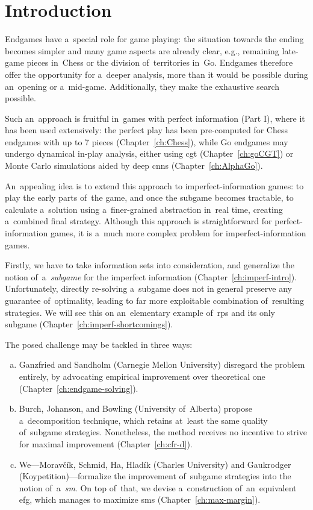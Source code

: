 \chapter*{Introduction}
Endgames have a~special role for game playing:
the situation towards the ending becomes simpler and many game aspects are already clear, e.g., remaining late-game pieces in~Chess or the division of~territories in~Go.
Endgames therefore offer the opportunity for a~deeper analysis, more than it would be possible during an~opening or a~mid-game.
Additionally, they make the exhaustive search possible.

Such an~approach is fruitful in~games with perfect information (Part I), where it has been used extensively:
the perfect play has been pre-computed for Chess endgames with up to 7 pieces (Chapter~\ref{ch:Chess}), while Go endgames may undergo dynamical in-play analysis, either using \acrlong{cgt} (Chapter~\ref{ch:goCGT}) or Monte Carlo simulations aided by deep \acrlong{cnn}s (Chapter~\ref{ch:AlphaGo}).

An~appealing idea is to extend this approach to imperfect-information games:
to play the early parts of~the game, and once the subgame becomes tractable, to calculate a~solution using a~finer-grained abstraction in~real time, creating a~combined final strategy.
Although this approach is straightforward for perfect-information games, it is a~much more complex problem for imperfect-information games. 

Firstly, we have to take information sets into consideration, and generalize the notion of~a~\emph{subgame} for the imperfect information (Chapter~\ref{ch:imperf-intro}).
Unfortunately, directly re-solving a~subgame does not in general preserve any guarantee of~optimality, leading to far more exploitable combination of~resulting strategies.
We will see this on an~elementary example of~\acrlong{rps} and its only subgame (Chapter~\ref{ch:imperf-shortcomings}).

The posed challenge may be tackled in three ways:
\begin{enumerate}[(a)]
  \item Ganzfried and Sandholm (Carnegie Mellon University) disregard the problem entirely, by advocating empirical improvement over theoretical one (Chapter~\ref{ch:endgame-solving}).
  \item Burch, Johanson, and Bowling (University of~Alberta) propose a~decomposition technique, which retains at~least the same quality of~subgame strategies.
    Nonetheless, the method receives no incentive to strive for maximal improvement (Chapter~\ref{ch:cfr-d}).
  \item We---Moravčík, Schmid, Ha, Hladík (Charles University) and Gaukrodger  (Koypetition)---formalize the improvement of~subgame strategies into the notion of~a~\emph{\acrlong{sm}}.
    On top of~that, we devise a~construction of~an~equivalent \acrlong{efg}, which manages to maximize \acrlong{sm}s (Chapter~\ref{ch:max-margin}).
\end{enumerate}
